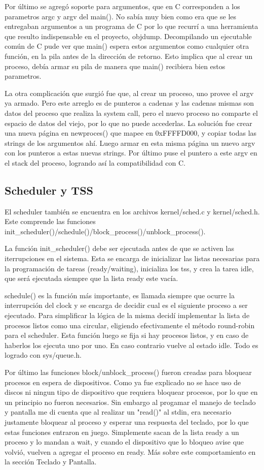 Por último se agregó soporte para argumentos, que en C corresponden a los
parametros argc y argv del main(). No sabía muy bien como era que se les
entregaban argumentos a un programa de C por lo que recurrí a una
herramienta que resulto indispensable en el proyecto, objdump. Decompilando un
ejecutable común de C pude ver que main() espera estos argumentos como cualquier
otra función, en la pila antes de la dirección de retorno. Esto implica que al
crear un proceso, debía armar su pila de manera que main() recibiera bien estos
parametros.

La otra complicación que surgió fue que, al crear un proceso, uno provee el
argv ya armado. Pero este arreglo es de punteros a cadenas y las cadenas mismas
son datos del proceso que realiza la system call, pero el nuevo proceso no
comparte el espacio de datos del viejo, por lo que no puede accederlas. La
solución fue crear una nueva página en newproces() que mapee en 0xFFFFD000, y
copiar todas las strings de los argumentos ahí. Luego armar en esta misma
página un nuevo argv con los punteros a estas nuevas strings. Por último puse
el puntero a este argv en el stack del proceso, logrando así la compatibilidad
con C.

\subsection{Scheduler y TSS}

El scheduler también se encuentra en los archivos kernel/sched.c y
kernel/sched.h. Este comprende las funciones
init\_scheduler()/schedule()/block\_process()/unblock\_process().

La función init\_scheduler() debe ser ejecutada antes de que se activen las
iterrupciones en el sistema. Esta se encarga de inicializar las listas
necesarias para la programación de tareas (ready/waiting), inicializa los tss,
y crea la tarea idle, que será ejecutada siempre que la lista ready este vacía.

schedule() es la función más importante, es llamada siempre que ocurre la
interrupción del clock y se encarga de decidir cual es el siguiente proceso a
ser ejecutado. Para simplificar la lógica de la misma decidí implementar la
lista de procesos listos como una circular, eligiendo efectivamente el método
round-robin para el scheduler. Esta función luego se fija si hay procesos
listos, y en caso de haberlos los ejecuta uno por uno. En caso contrario vuelve
al estado idle. Todo es logrado con sys/queue.h.

Por último las funciones block/unblock\_process() fueron creadas para bloquear
procesos en espera de dispositivos. Como ya fue explicado no se hace uso de
discos ni ningun tipo de dispositivo que requiera bloquear procesos, por lo que
en un principio no fueron necesarios. Sin embargo al progamar el manejo de
teclado y pantalla me di cuenta que al realizar un "read()" al stdin, era
necesario  justamente bloquear al proceso y esperar una respuesta del teclado,
por lo que estas funciones entraron en juego. Simplemente sacan de la lista
ready a un proceso y lo mandan a wait, y cuando el dispositivo que lo bloqueo
avise que volvió, vuelven a agregar el proceso en ready. Más sobre este
comportamiento en la sección Teclado y Pantalla.

